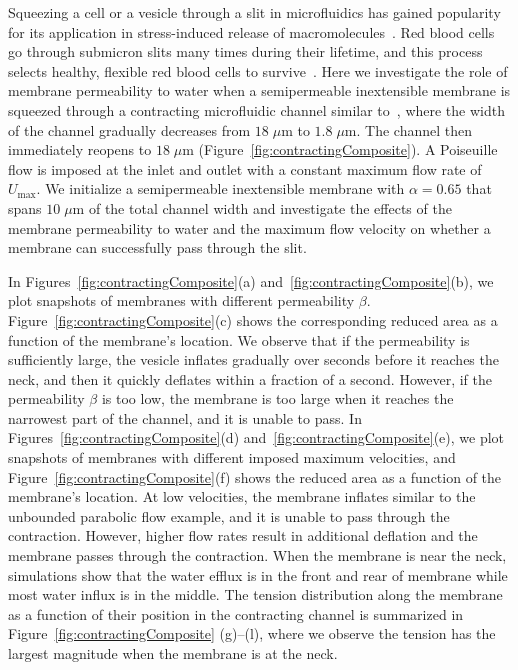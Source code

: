 \documentclass[prb,preprint,showpacs,preprintnumbers,amsmath,amssymb,longbibliography]{revtex4-1}
\begin{document}
Squeezing a cell or a vesicle through a slit in microfluidics
has gained popularity for its application in stress-induced release of
macromolecules~\cite{ShareiEtAl2013_PNAS, Pak2015_PNAS,
ZhangShenHoganBarakatMisbah2018_BJ, LuoBai2019_PoF}. Red blood cells go
through submicron slits many times during their lifetime, and this
process selects healthy, flexible red blood cells to
survive~\cite{wu2015critical,LuPeng2019_PoF}. Here we investigate the
role of membrane permeability to water when a semipermeable inextensible membrane is
squeezed through a contracting microfluidic channel similar
to~\citet{wu2015critical}, where the width of the channel gradually
decreases from $18 \;\mu$m to $1.8\; \mu$m. The channel then immediately
reopens to $18\;\mu$m (Figure~\ref{fig:contractingComposite}). A
Poiseuille flow is imposed at the inlet and outlet with a constant
maximum flow rate of $U_{\max}$. We initialize a semipermeable inextensible membrane
with $\alpha = 0.65$ that spans $10\; \mu$m of the total channel width
and investigate the effects of the membrane permeability to water and
the maximum flow velocity on whether a membrane can successfully pass
through the slit. 

In Figures~\ref{fig:contractingComposite}(a)
and~\ref{fig:contractingComposite}(b), we plot snapshots of membranes
with different permeability $\beta$.
Figure~\ref{fig:contractingComposite}(c) shows the corresponding reduced
area as a function of the membrane's location. We observe that if the
permeability is sufficiently large, the vesicle inflates gradually over
seconds before it reaches the neck, and then it quickly deflates within
a fraction of a second. However, if the permeability $\beta$ is too
low, the membrane is too large when it reaches the narrowest part of the
channel, and it is unable to pass. In
Figures~\ref{fig:contractingComposite}(d)
and~\ref{fig:contractingComposite}(e), we plot snapshots of membranes
with different imposed maximum velocities, and
Figure~\ref{fig:contractingComposite}(f) shows the reduced area as a
function of the membrane's location. At low velocities, the membrane
inflates similar to the unbounded parabolic flow example, and it is
unable to pass through the contraction. However, higher flow rates
result in additional deflation and the membrane passes through the
contraction. When the membrane is near the neck, simulations show that
the water efflux is in the front and rear of membrane while most water
influx is in the middle. The tension distribution along the membrane as
a function of their position in the contracting channel is summarized in
Figure~\ref{fig:contractingComposite} (g)--(l), where we observe the
tension has the largest magnitude when the membrane is at the neck. 
\end{document}
